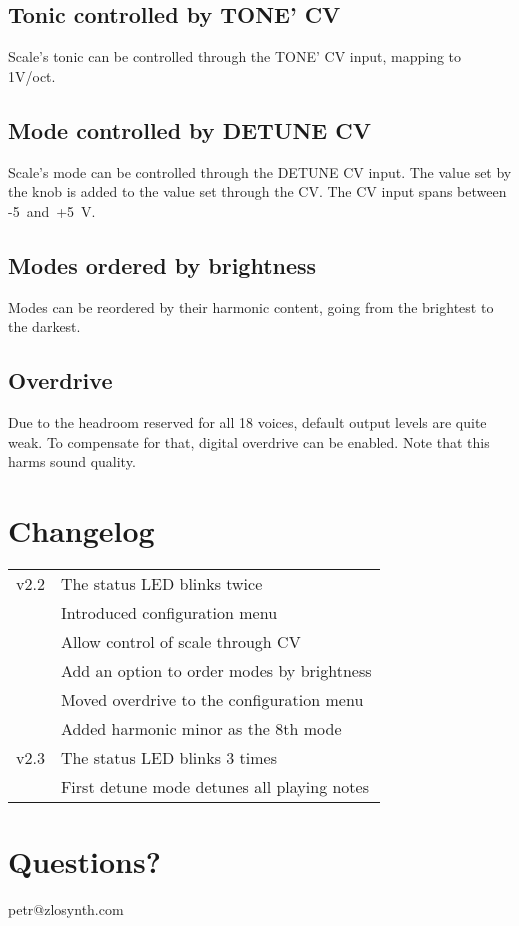 \documentclass[10pt,nofoldmark,nocombine]{leaflet} %
\begin{document}
\subsection{Tonic controlled by TONE' CV}

Scale's tonic can be controlled through the TONE' CV input, mapping to 1V/oct.

\subsection{Mode controlled by DETUNE CV}

Scale's mode can be controlled through the DETUNE CV input. The value set by the knob is added to the value set through the CV. The CV input spans between -5~and~+5~V.

\subsection{Modes ordered by brightness}

Modes can be reordered by their harmonic content, going from the brightest to the darkest.

\subsection{Overdrive}

Due to the headroom reserved for all 18 voices, default output levels are quite weak. To compensate for that, digital overdrive can be enabled. Note that this harms sound quality.

\section{Changelog}

\begin{tabular}{@{}rl@{}}
  v2.2 & The status LED blinks twice \\
       & Introduced configuration menu \\
       & Allow control of scale through CV \\
       & Add an option to order modes by brightness \\
       & Moved overdrive to the configuration menu \\
       & Added harmonic minor as the 8th mode \\
  v2.3 & The status LED blinks 3 times \\
       & First detune mode detunes all playing notes
\end{tabular}

\section{Questions?}

\begin{center}
petr@zlosynth.com
\end{center}
\end{document}
